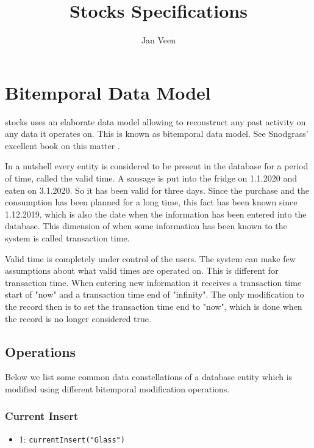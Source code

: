 \documentclass{memoir}
\title{Stocks Specifications}
\author{Jan Veen}
\begin{document}
\maketitle
\frontmatter

\tableofcontents
\listoffigures
\listoftables
\mainmatter

\chapter{Bitemporal Data Model}

stocks \cite{stocks} uses an elaborate data model allowing to reconstruct any past activity on
any data it operates on. This is known as bitemporal data model. See Snodgrass'
excellent book on this matter \cite{snodgrass}.

In a nutshell every entity is considered to be present in the database for a
period of time, called the valid time. A sausage is put into the fridge on
1.1.2020 and eaten on 3.1.2020. So it has been valid for three days. Since the
purchase and the consumption has been planned for a long time, this fact has
been known since 1.12.2019, which is also the date when the information has been
entered into the database. This dimension of when some information has been
known to the system is called transaction time.

Valid time is completely under control of the users. The system can make few
assumptions about what valid times are operated on. This is different for
transaction time. When entering new information it receives a transaction time
start of "now" and a transaction time end of "infinity". The only modification
to the record then is to set the transaction time end to "now", which is done
when the record is no longer considered true.

\section{Operations}

Below we list some common data constellations of a database entity which is
modified using different bitemporal modification operations.

\subsection{Current Insert}

\begin{itemize}
\item 1: \texttt{currentInsert("Glass")}
\end{itemize}
\end{document}
